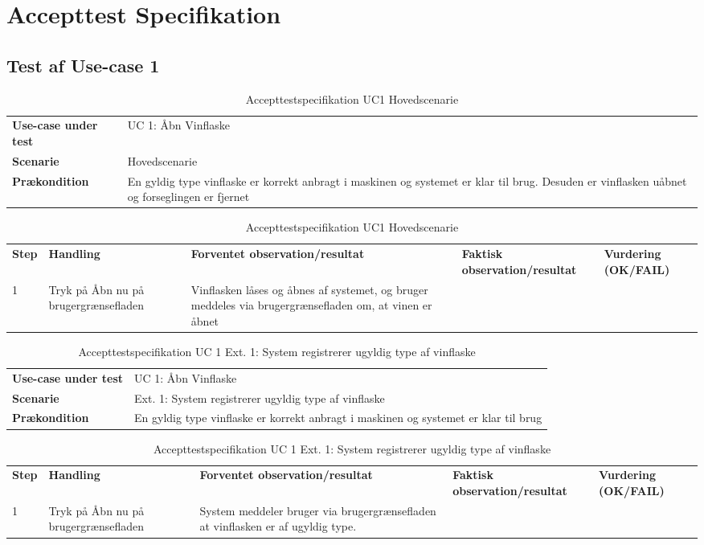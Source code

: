 \chapter{Accepttest Specifikation}
\section{Test af Use-case 1}
\begin{table}[H]
	\centering
	\caption{Accepttestspecifikation UC1 Hovedscenarie}
	\label{ATUC1:Hovedscenarie}
	\begin{tabular}{ p{80pt}  p{320pt} }\hline
		\rowcolor{white}	
		\textbf{Use-case under test} & UC 1: Åbn Vinflaske \\
		\rowcolor{lightgray}
		\textbf{Scenarie} & Hovedscenarie \\\rowcolor{white}	
		\textbf{Prækondition} &
		En gyldig type vinflaske er korrekt anbragt i maskinen og systemet er klar til brug. Desuden
		er vinflasken uåbnet og forseglingen er fjernet
 \\
		\hline
	\end{tabular}
	\begin{tabular}{  p{26pt} p{100pt}  p{101pt} | p{67pt} | p{68pt}}
		\textbf{Step} & \textbf{Handling} & \textbf{Forventet observation/resultat} & \textbf{Faktisk observation/resultat} & \textbf{Vurdering (OK/FAIL)}\\
		1 & Tryk på Åbn nu på
		brugergrænsefladen & Vinflasken låses og åbnes af
		systemet, og bruger
		meddeles via
		brugergrænsefladen
		om, at vinen er åbnet &  &  \\
		\hline
	\end{tabular}
\end{table}

\begin{table}[H]
	\centering
	\caption{Accepttestspecifikation UC 1 Ext. 1: System registrerer ugyldig type af vinflaske}
	\label{ATUC1:Ext1}
	\begin{tabular}{ p{80pt}  p{320pt} }\hline
		\rowcolor{lightgray}	
		\textbf{Use-case under test} & UC 1: Åbn Vinflaske \\
		\rowcolor{white}
		\textbf{Scenarie} & Ext. 1: System registrerer ugyldig type af vinflaske \\\rowcolor{lightgray}	
		\textbf{Prækondition} &
		En gyldig type vinflaske er korrekt anbragt i maskinen og systemet er klar til brug \\
		\hline
	\end{tabular}
	
	\begin{tabular}{  p{26pt} p{100pt}  p{101pt} | p{67pt} | p{68pt}}
		\textbf{Step} & \textbf{Handling} & \textbf{Forventet observation/resultat} & \textbf{Faktisk observation/resultat} & \textbf{Vurdering (OK/FAIL)}\\
		1 & Tryk på Åbn nu på
		brugergrænsefladen & System meddeler bruger
		via brugergrænsefladen
		at vinflasken er af
		ugyldig type.
 &  &  \\
		\hline
	\end{tabular}
\end{table}

